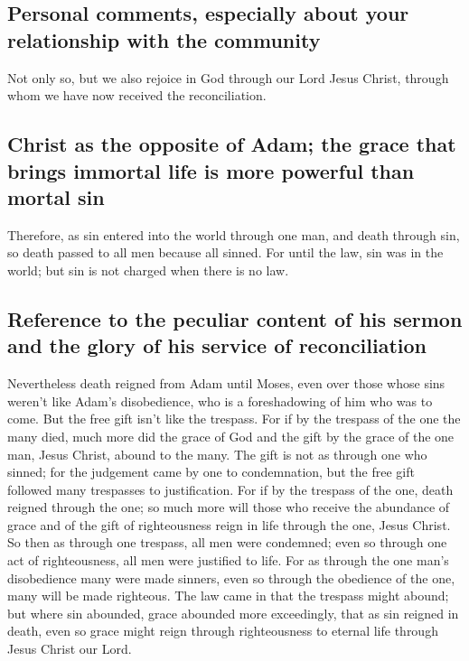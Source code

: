 \hypertarget{personal-comments-especially-about-your-relationship-with-the-community}{%
\subsection{Personal comments, especially about your relationship with
the
community}\label{personal-comments-especially-about-your-relationship-with-the-community}}

 Not only so, but we also rejoice in God through our Lord
Jesus Christ, through whom we have now received the reconciliation.

\hypertarget{christ-as-the-opposite-of-adam-the-grace-that-brings-immortal-life-is-more-powerful-than-mortal-sin}{%
\subsection{Christ as the opposite of Adam; the grace that brings
immortal life is more powerful than mortal
sin}\label{christ-as-the-opposite-of-adam-the-grace-that-brings-immortal-life-is-more-powerful-than-mortal-sin}}

 Therefore, as sin entered into the world through one
man, and death through sin, so death passed to all men because all
sinned.  For until the law, sin was in the world; but sin
is not charged when there is no law.

\hypertarget{reference-to-the-peculiar-content-of-his-sermon-and-the-glory-of-his-service-of-reconciliation}{%
\subsection{Reference to the peculiar content of his sermon and the
glory of his service of
reconciliation}\label{reference-to-the-peculiar-content-of-his-sermon-and-the-glory-of-his-service-of-reconciliation}}

 Nevertheless death reigned from Adam until Moses, even
over those whose sins weren't like Adam's disobedience, who is a
foreshadowing of him who was to come.  But the free gift
isn't like the trespass. For if by the trespass of the one the many
died, much more did the grace of God and the gift by the grace of the
one man, Jesus Christ, abound to the many.  The gift is
not as through one who sinned; for the judgement came by one to
condemnation, but the free gift followed many trespasses to
justification.  For if by the trespass of the one, death
reigned through the one; so much more will those who receive the
abundance of grace and of the gift of righteousness reign in life
through the one, Jesus Christ.  So then as through one
trespass, all men were condemned; even so through one act of
righteousness, all men were justified to life.  For as
through the one man's disobedience many were made sinners, even so
through the obedience of the one, many will be made righteous.
 The law came in that the trespass might abound; but
where sin abounded, grace abounded more exceedingly, 
that as sin reigned in death, even so grace might reign through
righteousness to eternal life through Jesus Christ our Lord.

